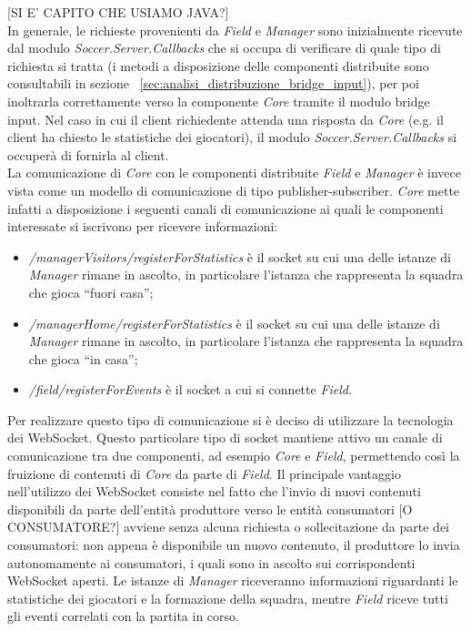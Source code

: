 [SI E' CAPITO CHE USIAMO JAVA?]\\

In generale, le richieste provenienti da \emph{Field} e \emph{Manager} sono inizialmente ricevute dal modulo \emph{Soccer.Server.Callbacks} che si occupa di verificare di quale tipo di richiesta si tratta (i metodi a disposizione delle componenti distribuite sono consultabili in sezione ~\ref{sec:analisi_distribuzione_bridge_input}), per poi inoltrarla correttamente verso la componente \emph{Core} tramite il modulo bridge input. Nel caso in cui il client richiedente attenda una risposta da \emph{Core} (e.g. il client ha chiesto le statistiche dei giocatori), il modulo \emph{Soccer.Server.Callbacks} si occuper\`{a} di fornirla al client.\\

La comunicazione di \emph{Core} con le componenti distribuite \emph{Field} e \emph{Manager} \`{e} invece vista come un modello di comunicazione di tipo publisher-subscriber. \emph{Core} mette infatti a disposizione i seguenti canali di comunicazione ai quali le componenti interessate si iscrivono per ricevere informazioni:

\begin{itemize}
	\item \emph{/managerVisitors/registerForStatistics} \`{e} il socket su cui una delle istanze di \emph{Manager} rimane in ascolto, in particolare l'istanza che rappresenta la squadra che gioca ``fuori casa'';
	\item \emph{/managerHome/registerForStatistics} \`{e} il socket su cui una delle istanze di \emph{Manager} rimane in ascolto, in particolare l'istanza che rappresenta la squadra che gioca ``in casa'';
	\item \emph{/field/registerForEvents} \`{e} il socket a cui si connette \emph{Field}.
\end{itemize}

Per realizzare questo tipo di comunicazione si è deciso di utilizzare la tecnologia dei WebSocket. Questo particolare tipo di socket mantiene attivo un canale di comunicazione tra due componenti, ad esempio \emph{Core} e \emph{Field}, permettendo cos\`{i} la fruizione di contenuti di \emph{Core} da parte di \emph{Field}. Il principale vantaggio nell'utilizzo dei WebSocket consiste nel fatto che l'invio di nuovi contenuti disponibili da parte dell'entit\`{a} produttore verso le entit\`{a} consumatori [O CONSUMATORE?] avviene senza alcuna richiesta o sollecitazione da parte dei consumatori: non appena \`{e} disponibile un nuovo contenuto, il produttore lo invia autonomamente ai consumatori, i quali sono in ascolto sui corrispondenti WebSocket aperti. Le istanze di \emph{Manager} riceveranno informazioni riguardanti le statistiche dei giocatori e la formazione della squadra, mentre \emph{Field} riceve tutti gli eventi correlati con la partita in corso.\\

